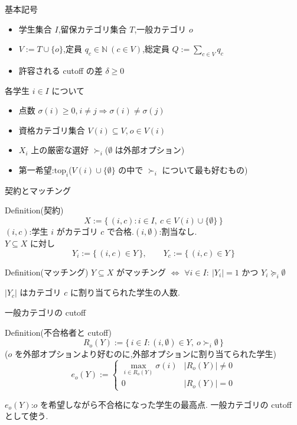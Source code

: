 \documentclass[aspectratio=43,11pt]{beamer}
\newcommand{\topf}{\mathrm{top}}
\begin{document}
\begin{frame}{基本記号}
\small
\begin{itemize}
  \item 学生集合 $I$,留保カテゴリ集合 $T$,一般カテゴリ $o$
  \item $V := T \cup \{o\}$,定員 $q_c \in \mathbb{N}\ (c \in V)$,総定員 $Q := \sum_{c \in V} q_c$
  \item 許容される cutoff の差 $\delta \geq 0$
\end{itemize}
各学生 $i \in I$ について
\begin{itemize}
  \item 点数 $\sigma(i) \geq 0$,$\ i \neq j \Rightarrow \sigma(i) \neq \sigma(j)$
  \item 資格カテゴリ集合 $V(i) \subseteq V$,$\ o \in V(i)$
  \item $X_i$ 上の厳密な選好 $\succ_i$($\emptyset$ は外部オプション)
  \item 第一希望:$\topf_i$($V(i) \cup \{\emptyset\}$ の中で $\succ_i$ について最も好むもの)
\end{itemize}
\end{frame}

\begin{frame}{契約とマッチング}
\small
\begin{block}{Definition(契約)}
  \[
    X := \{\, (i,c) : i \in I,\ c \in V(i) \cup \{\emptyset\} \,\}
  \]
  $(i,c)$:学生 $i$ がカテゴリ $c$ で合格.$(i,\emptyset)$:割当なし.\\
  $Y \subseteq X$ に対し
  \[
    Y_i := \{\, (i,c) \in Y \,\}, \qquad Y_c := \{\, (i,c) \in Y \,\}
  \]
\end{block}
\begin{block}{Definition(マッチング)}
  $Y \subseteq X$ がマッチング $\iff$ $\forall i \in I:\ |Y_i| = 1$ かつ $Y_i \succeq_i \emptyset$
\end{block}
$|Y_c|$ はカテゴリ $c$ に割り当てられた学生の人数.
\end{frame}

\begin{frame}{一般カテゴリの cutoff}
\begin{block}{Definition(不合格者と cutoff)}
  \[
    R_o(Y) := \{\, i \in I : (i,\emptyset) \in Y,\ o \succ_i \emptyset \,\}
  \]
  ($o$ を外部オプションより好むのに,外部オプションに割り当てられた学生)
  \[
    e_o(Y) :=
    \begin{cases}
      \max_{i \in R_o(Y)} \sigma(i) & |R_o(Y)| \neq 0 \\
      0 & |R_o(Y)| = 0
    \end{cases}
  \]
\end{block}
$e_o(Y)$:$o$ を希望しながら不合格になった学生の最高点.
一般カテゴリの cutoff として使う.
\end{frame}
\end{document}
